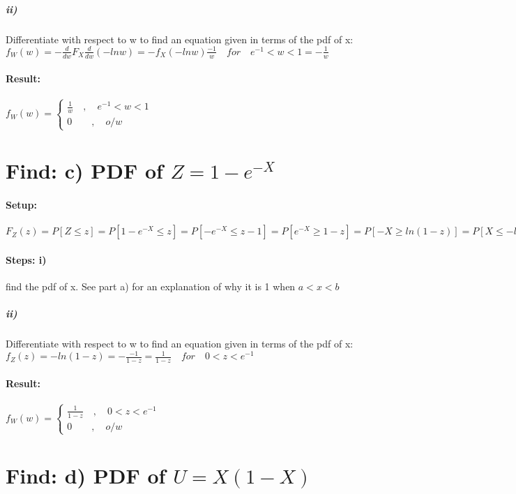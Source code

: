 \subparagraph{ii)}Differentiate with respect to w to find an equation given in terms of the pdf of x:\\ ${ f }_{ W }(w)= -\frac { d }{ dw } { F }_{ X }\frac { d }{ dw}(-lnw) = -{ f }_{ X }(-lnw)\frac{-1}{w} \quad for \quad {e}^{-1}<w<1=-\frac{1}{w}$

\paragraph{Result:} ${ f }_{ W }(w)=\begin{cases} \frac{ 1 }{w} \quad ,\quad {e}^{-1}<w<1 \\ 0\quad  \quad ,\quad o/w \end{cases}$

\section*{Find: c) PDF of $Z=1-{e}^{-X}$ }

\paragraph{Setup:} ${ F }_{ Z }(z)=P[Z\le z]=P[1-{e}^{-X}\le z]=P[-{e}^{-X}\le z-1]=P[{e}^{-X}\ge 1-z]= P[-X\ge ln(1-z)]=P[X\le -ln(1-z)]={F}_{x}(-ln(1-z))$

\paragraph{Steps: i)} find the pdf of x. See part a) for an explanation of why it is 1 when $a<x<b$


\subparagraph{ii)}Differentiate with respect to w to find an equation given in terms of the pdf of x:\\ ${ f }_{ Z }(z)= -ln(1-z)=-\frac { -1 }{1-z}=\frac{1}{1-z} \quad for \quad 0<z<{e}^{-1}$

\paragraph{Result:} ${ f }_{ W }(w)=\begin{cases} \frac{ 1 }{1-z} \quad ,\quad 0<z<{e}^{-1} \\ 0\quad  \quad ,\quad o/w \end{cases}$

\section*{Find: d) PDF of $U=X(1-X)$ }

